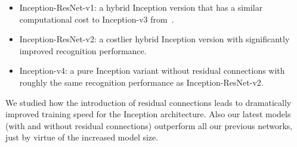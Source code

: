 \documentclass[10pt,twocolumn,letterpaper]{article}
\begin{document}
\begin{itemize}
  \item Inception-ResNet-v1: a hybrid Inception version that has a
    similar computational cost to Inception-v3
    from~\cite{szegedy2015rethinking}.
  \item Inception-ResNet-v2: a costlier hybrid Inception version with
    significantly improved recognition performance.
  \item Inception-v4: a pure Inception variant without residual connections
    with roughly the same recognition performance as Inception-ResNet-v2.
\end{itemize}

We studied how the introduction of residual connections leads to dramatically
improved training speed for the Inception architecture. Also our latest models
(with and without residual connections) outperform all our previous networks,
just by virtue of the increased model size.
 



{\small


}
\end{document}
